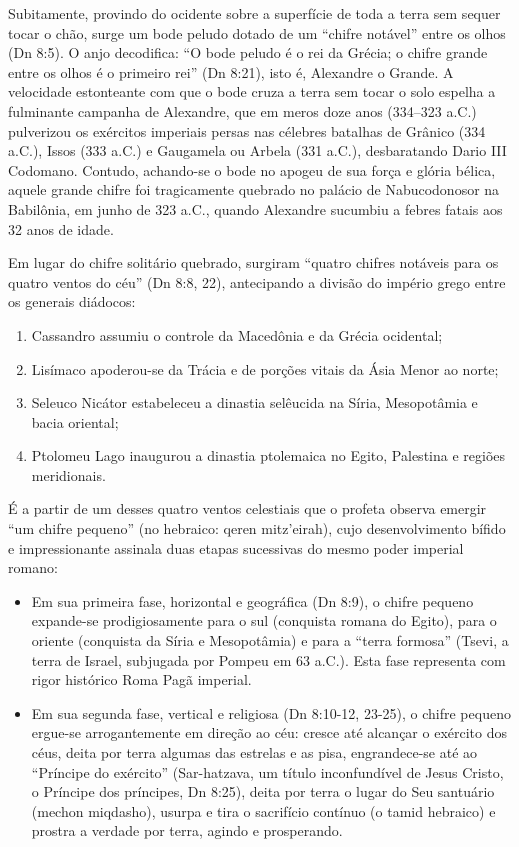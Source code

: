 Subitamente, provindo do ocidente sobre a superfície de toda a terra sem sequer tocar o chão, surge um bode peludo dotado de um ``chifre notável'' entre os olhos (Dn 8:5). O anjo decodifica: ``O bode peludo é o rei da Grécia; o chifre grande entre os olhos é o primeiro rei'' (Dn 8:21), isto é, Alexandre o Grande. A velocidade estonteante com que o bode cruza a terra sem tocar o solo espelha a fulminante campanha de Alexandre, que em meros doze anos (334–323 a.C.) pulverizou os exércitos imperiais persas nas célebres batalhas de Grânico (334 a.C.), Issos (333 a.C.) e Gaugamela ou Arbela (331 a.C.), desbaratando Dario III Codomano. Contudo, achando-se o bode no apogeu de sua força e glória bélica, aquele grande chifre foi tragicamente quebrado no palácio de Nabucodonosor na Babilônia, em junho de 323 a.C., quando Alexandre sucumbiu a febres fatais aos 32 anos de idade.

Em lugar do chifre solitário quebrado, surgiram ``quatro chifres notáveis para os quatro ventos do céu'' (Dn 8:8, 22), antecipando a divisão do império grego entre os generais diádocos:
\begin{enumerate}
  \item Cassandro assumiu o controle da Macedônia e da Grécia ocidental;
  \item Lisímaco apoderou-se da Trácia e de porções vitais da Ásia Menor ao norte;
  \item Seleuco Nicátor estabeleceu a dinastia selêucida na Síria, Mesopotâmia e bacia oriental;
  \item Ptolomeu Lago inaugurou a dinastia ptolemaica no Egito, Palestina e regiões meridionais.
\end{enumerate}


É a partir de um desses quatro ventos celestiais que o profeta observa emergir ``um chifre pequeno'' (no hebraico: qeren mitz'eirah), cujo desenvolvimento bífido e impressionante assinala duas etapas sucessivas do mesmo poder imperial romano:
\begin{itemize}
  \item Em sua primeira fase, horizontal e geográfica (Dn 8:9), o chifre pequeno expande-se prodigiosamente para o sul (conquista romana do Egito), para o oriente (conquista da Síria e Mesopotâmia) e para a ``terra formosa'' (Tsevi, a terra de Israel, subjugada por Pompeu em 63 a.C.). Esta fase representa com rigor histórico Roma Pagã imperial.
  \item Em sua segunda fase, vertical e religiosa (Dn 8:10-12, 23-25), o chifre pequeno ergue-se arrogantemente em direção ao céu: cresce até alcançar o exército dos céus, deita por terra algumas das estrelas e as pisa, engrandece-se até ao ``Príncipe do exército'' (Sar-hatzava, um título inconfundível de Jesus Cristo, o Príncipe dos príncipes, Dn 8:25), deita por terra o lugar do Seu santuário (mechon miqdasho), usurpa e tira o sacrifício contínuo (o tamid hebraico) e prostra a verdade por terra, agindo e prosperando.
\end{itemize}



